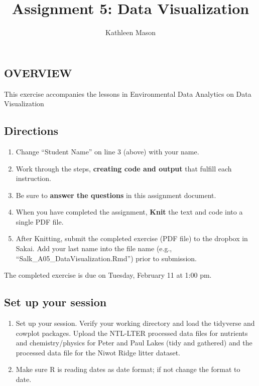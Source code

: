 \documentclass[]{article}
\title{Assignment 5: Data Visualization}
\author{Kathleen Mason}
\date{}
\providecommand{\tightlist}{%
  \setlength{\itemsep}{0pt}\setlength{\parskip}{0pt}}
\begin{document}
\maketitle

\hypertarget{overview}{%
\subsection{OVERVIEW}\label{overview}}

This exercise accompanies the lessons in Environmental Data Analytics on
Data Visualization

\hypertarget{directions}{%
\subsection{Directions}\label{directions}}

\begin{enumerate}
\def\labelenumi{\arabic{enumi}.}
\tightlist
\item
  Change ``Student Name'' on line 3 (above) with your name.
\item
  Work through the steps, \textbf{creating code and output} that fulfill
  each instruction.
\item
  Be sure to \textbf{answer the questions} in this assignment document.
\item
  When you have completed the assignment, \textbf{Knit} the text and
  code into a single PDF file.
\item
  After Knitting, submit the completed exercise (PDF file) to the
  dropbox in Sakai. Add your last name into the file name (e.g.,
  ``Salk\_A05\_DataVisualization.Rmd'') prior to submission.
\end{enumerate}

The completed exercise is due on Tuesday, February 11 at 1:00 pm.

\hypertarget{set-up-your-session}{%
\subsection{Set up your session}\label{set-up-your-session}}

\begin{enumerate}
\def\labelenumi{\arabic{enumi}.}
\item
  Set up your session. Verify your working directory and load the
  tidyverse and cowplot packages. Upload the NTL-LTER processed data
  files for nutrients and chemistry/physics for Peter and Paul Lakes
  (tidy and gathered) and the processed data file for the Niwot Ridge
  litter dataset.
\item
  Make sure R is reading dates as date format; if not change the format
  to date.
\end{enumerate}
\end{document}

